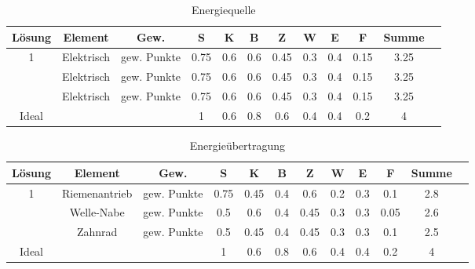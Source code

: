 \documentclass[10pt,a4paper]{article}
\begin{document}
\begin{table}[h!]
    \centering
    \begin{tabular}{cccccccccccc}
        \toprule
        \textbf{Lösung} & \textbf{Element} & \textbf{Gew.} & \textbf{S} & \textbf{K} & \textbf{B} & \textbf{Z} & \textbf{W} & \textbf{E} & \textbf{F} & \textbf{Summe} & \\
        \midrule
        1               & Elektrisch       & gew. Punkte   & 0.75       & 0.6        & 0.6        & 0.45       & 0.3        & 0.4        & 0.15       & 3.25             \\
        \addlinespace
        2               & Elektrisch       & gew. Punkte   & 0.75       & 0.6        & 0.6        & 0.45       & 0.3        & 0.4        & 0.15       & 3.25             \\
        \addlinespace
        3               & Elektrisch       & gew. Punkte   & 0.75       & 0.6        & 0.6        & 0.45       & 0.3        & 0.4        & 0.15       & 3.25             \\
        \midrule
        Ideal           &                  &               & 1          & 0.6        & 0.8        & 0.6        & 0.4        & 0.4        & 0.2        & 4                \\
        \bottomrule
    \end{tabular}
    \caption{Energiequelle}
    \label{tab:energiequelle}
\end{table}

\begin{table}[h!]
    \centering
    \begin{tabular}{cccccccccccc}
        \toprule
        \textbf{Lösung} & \textbf{Element} & \textbf{Gew.} & \textbf{S} & \textbf{K} & \textbf{B} & \textbf{Z} & \textbf{W} & \textbf{E} & \textbf{F} & \textbf{Summe} & \\
        \midrule
        1               & Riemenantrieb    & gew. Punkte   & 0.75       & 0.45       & 0.4        & 0.6        & 0.2        & 0.3        & 0.1        & 2.8              \\
        \addlinespace
        2               & Welle-Nabe       & gew. Punkte   & 0.5        & 0.6        & 0.4        & 0.45       & 0.3        & 0.3        & 0.05       & 2.6              \\
        \addlinespace
        3               & Zahnrad          & gew. Punkte   & 0.5        & 0.45       & 0.4        & 0.45       & 0.3        & 0.3        & 0.1        & 2.5              \\
        \midrule
        Ideal           &                  &               & 1          & 0.6        & 0.8        & 0.6        & 0.4        & 0.4        & 0.2        & 4                \\
        \bottomrule
    \end{tabular}
    \caption{Energieübertragung}
    \label{tab:energieuebertragung}
\end{table}
\end{document}

